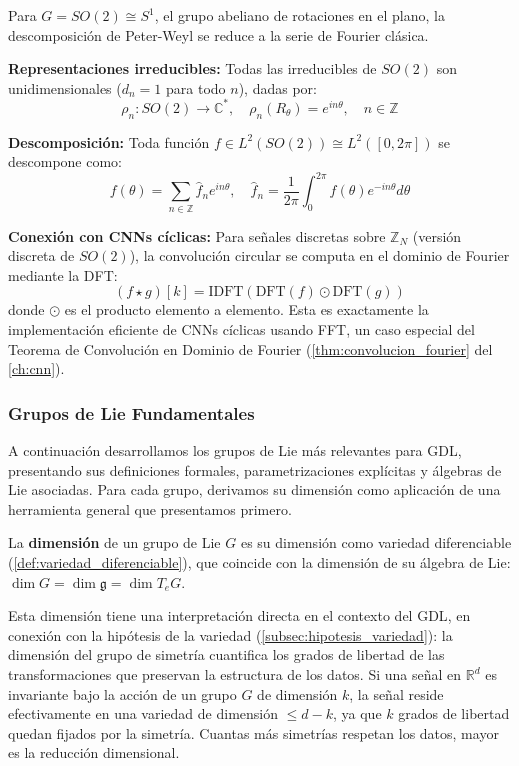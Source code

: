 \begin{example}\label{ex:peter_weyl_so2_detallado}
	Para $G = SO(2) \cong S^1$, el grupo abeliano de rotaciones en el plano, la descomposición de Peter-Weyl se reduce a la serie de Fourier clásica.

	\textbf{Representaciones irreducibles:} Todas las irreducibles de $SO(2)$ son unidimensionales ($d_n = 1$ para todo $n$), dadas por:
	\[
		\rho_n: SO(2) \to \mathbb{C}^*, \quad \rho_n(R_\theta) = e^{in\theta}, \quad n \in \mathbb{Z}
	\]

	\textbf{Descomposición:} Toda función $f \in L^2(SO(2)) \cong L^2([0, 2\pi])$ se descompone como:
	\[
		f(\theta) = \sum_{n \in \mathbb{Z}} \hat{f}_n e^{in\theta}, \quad \hat{f}_n = \frac{1}{2\pi} \int_0^{2\pi} f(\theta) e^{-in\theta} d\theta
	\]

	\textbf{Conexión con CNNs cíclicas:} Para señales discretas sobre $\mathbb{Z}_N$ (versión discreta de $SO(2)$), la convolución circular se computa en el dominio de Fourier mediante la DFT:
	\[
		(f \star g)[k] = \text{IDFT}(\text{DFT}(f) \odot \text{DFT}(g))
	\]
	donde $\odot$ es el producto elemento a elemento. Esta es exactamente la implementación eficiente de CNNs cíclicas usando FFT, un caso especial del Teorema de Convolución en Dominio de Fourier (\autoref{thm:convolucion_fourier} del \autoref{ch:cnn}).
\end{example}

\subsubsection{Grupos de Lie Fundamentales}\label{subsubsec:grupos_lie_fundamentales}

A continuación desarrollamos los grupos de Lie más relevantes para \gls{GDL}, presentando sus definiciones formales, parametrizaciones explícitas y álgebras de Lie asociadas. Para cada grupo, derivamos su dimensión como aplicación de una herramienta general que presentamos primero.

\begin{remark}\label{rem:dimension_grupo_lie}
La \textbf{dimensión} de un grupo de Lie $G$ es su dimensión como variedad diferenciable (\autoref{def:variedad_diferenciable}), que coincide con la dimensión de su álgebra de Lie: $\dim G = \dim \mathfrak{g} = \dim T_eG$.

Esta dimensión tiene una interpretación directa en el contexto del \gls{GDL}, en conexión con la hipótesis de la variedad (\autoref{subsec:hipotesis_variedad}): la dimensión del grupo de simetría cuantifica los grados de libertad de las transformaciones que preservan la estructura de los datos. Si una señal en $\mathbb{R}^d$ es invariante bajo la acción de un grupo $G$ de dimensión $k$, la señal reside efectivamente en una variedad de dimensión $\leq d - k$, ya que $k$ grados de libertad quedan fijados por la simetría. Cuantas más simetrías respetan los datos, mayor es la reducción dimensional.
\end{remark}

